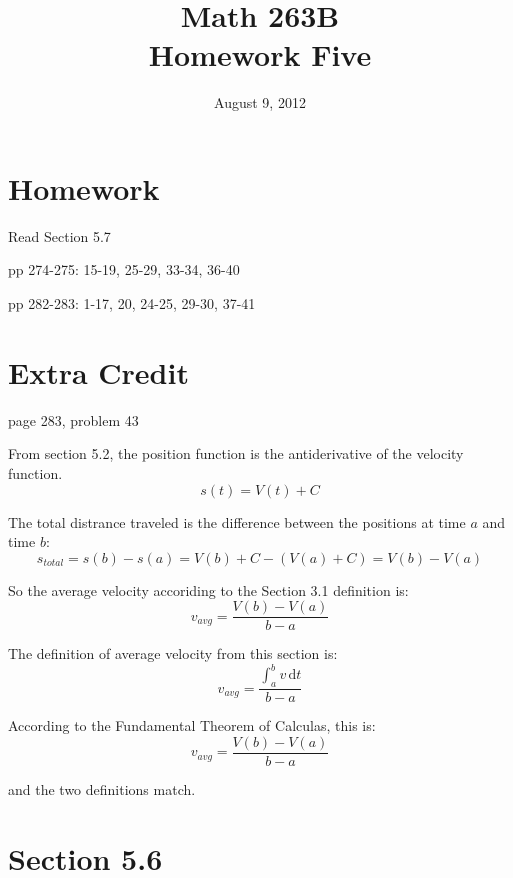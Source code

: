 \documentclass{exam}
\title{Math 263B \\ Homework Five}
\date{August 9, 2012}
\begin{document}
\maketitle

\section{Homework}

\begin{itemize*}
  \item Read Section 5.7
  \item pp 274-275: 15-19, 25-29, 33-34, 36-40
  \item pp 282-283: 1-17, 20, 24-25, 29-30, 37-41
\end{itemize*}

\section{Extra Credit}
page 283, problem 43

\begin{solution}
From section 5.2, the position function is the antiderivative of the velocity function.
\[
  s(t) = V(t) + C
\]

The total distrance traveled is the difference between the positions at time $a$ and time $b$:
\[
  s_{total} = s(b) - s(a) = V(b) + C - (V(a) + C) = V(b) - V(a)
\]

So the average velocity accoriding to the Section 3.1 definition is:
\[
  v_{avg} = \frac{V(b) - V(a)}{b - a}
\]

The definition of average velocity from this section is:
\[
  v_{avg} = \frac{\int_a^b v \, \mathrm{d}t}{b - a}
\]

According to the Fundamental Theorem of Calculas, this is:
\[
  v_{avg} = \frac{V(b) - V(a)}{b - a} 
\]

and the two definitions match.

\end{solution}

\ifprintanswers

\section{Section 5.6}
\end{document}
